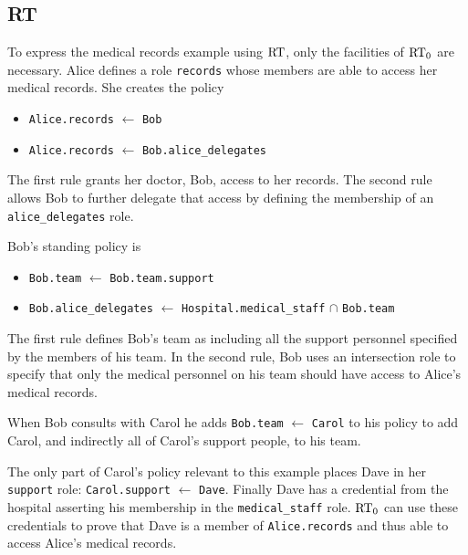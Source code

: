 \documentclass{article}
\begin{document}

\subsection{RT}

To express the medical records example using $\text{RT}$, only the facilities of
$\text{RT}_0$ are necessary. Alice defines a role \texttt{records} whose members
are able to access her medical records. She creates the policy

\begin{itemize}
\item \texttt{Alice.records} $\leftarrow$ \texttt{Bob}
\item \texttt{Alice.records} $\leftarrow$ \texttt{Bob.alice\_delegates}
\end{itemize}

The first rule grants her doctor, Bob, access to her records. The second
rule allows Bob to further delegate that access by defining the membership
of an \texttt{alice\_delegates} role.

Bob's standing policy is

\begin{itemize}
\item \texttt{Bob.team} $\leftarrow$ \texttt{Bob.team.support}
\item \texttt{Bob.alice\_delegates} $\leftarrow$
  \texttt{Hospital.medical\_staff} $\cap$ \texttt{Bob.team}
\end{itemize}

The first rule defines Bob's team as including all the support personnel
specified by the members of his team. In the second rule, Bob uses an
intersection role to specify that only the medical personnel on his team
should have access to Alice's medical records.

When Bob consults with Carol he adds \texttt{Bob.team} $\leftarrow$
\texttt{Carol} to his policy to add Carol, and indirectly all of Carol's
support people, to his team.

The only part of Carol's policy relevant to this example places Dave in her
\texttt{support} role: \texttt{Carol.support} $\leftarrow$ \texttt{Dave}.
Finally Dave has a credential from the hospital asserting his membership in
the \texttt{medical\_staff} role. $\text{RT}_0$ can use these credentials to
prove that Dave is a member of \texttt{Alice.records} and thus able to
access Alice's medical records.
\end{document}
